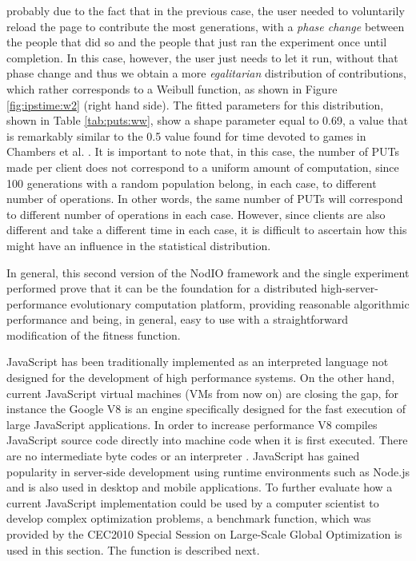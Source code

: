 \documentclass[journal,onecolumn]{IEEEtran}
\begin{document}
probably due to the fact that in the previous case, the user needed to
voluntarily reload the page to contribute the most generations, with a
{\em phase change} between the people that did so and the people that
just ran the experiment once until completion. In this case, however, the
user just needs to let it run, without that phase change and thus we obtain a
more {\em egalitarian} distribution of contributions, which rather
corresponds to a Weibull function, as shown in Figure
\ref{fig:ipstime:w2} (right hand side). The fitted parameters for this
distribution, shown in Table \ref{tab:puts:ww}, show a shape parameter
equal to 0.69, a value that is remarkably similar to the 0.5 value
found for time devoted to games in Chambers et
al. \cite{chambers2005measurement}. It is important to note that, in
this case, the number of PUTs made per client does not correspond to a
uniform amount of computation, since 100 generations with a random
population belong, in each case, to different number of
operations. In other words, the same number of PUTs will correspond to
different number of operations in each case. However, since clients
are also different and take a different time in each case, it is
difficult to ascertain how this might have an influence in the
statistical distribution.

In general, this second version of the {\sf NodIO} framework and the
single experiment performed prove that it can be the foundation for a distributed
high-server-performance evolutionary computation platform,
providing reasonable algorithmic performance and being, in general,
easy to use with a straightforward modification of the fitness
function. 


JavaScript has been traditionally implemented as an interpreted
language not designed for the development of high performance
systems. On the other hand, current JavaScript  
virtual machines (VMs from now on) are closing the gap, for instance the Google V8 
is an engine specifically designed for the fast execution of 
large JavaScript applications. In order to increase performance
V8 compiles JavaScript source code directly into machine code when it is first executed. 
There are no intermediate byte codes or an interpreter \cite{Gray:2009:GCM:1610564.1610565}.
JavaScript has gained popularity in server-side development using runtime
environments such as Node.js and is also used in desktop and mobile applications. 
To further evaluate how a current JavaScript implementation could be used by a
computer scientist to develop complex optimization problems,
a benchmark function, which was provided by the CEC2010 Special Session on
Large-Scale Global Optimization \cite{tang2007benchmark} is used in this section. 
The function is described next.
\end{document}
